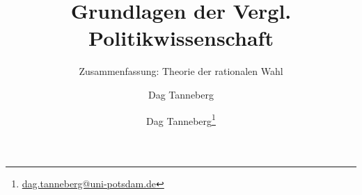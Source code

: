 \usepackage[ngerman]{babel}
\usepackage[utf8]{inputenc}
\usepackage{graphicx}
\usepackage{hyperref}
\usepackage{multirow}
\usepackage{booktabs}
\usepackage{tikz}
  \usetikzlibrary{positioning}
  \usetikzlibrary{calc}
  \usetikzlibrary{matrix}
\usepackage{adjustbox}
\usepackage{tikzscale}

\author{Dag Tanneberg}
\title{Grundlagen der Vergl. Politikwissenschaft}
\subtitle{Zusammenfassung: Theorie der rationalen Wahl}
\author{Dag Tanneberg\thanks{%
  \href{mailto:dag.tanneberg@uni-potsdam.de}%
    {dag.tanneberg@uni-potsdam.de}
  }
}
\hypersetup{colorlinks, urlcolor = red, linkcolor = }
